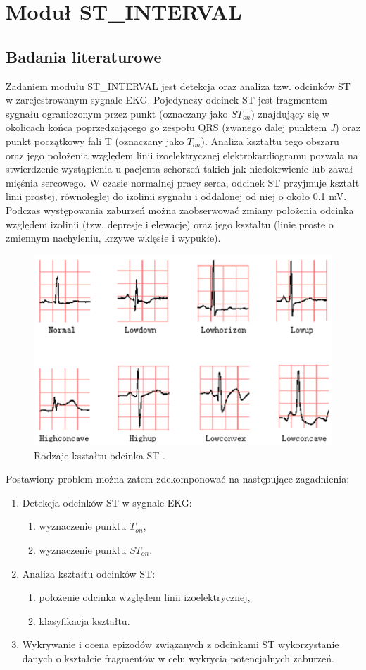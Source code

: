 \section{Moduł ST\_INTERVAL}
\subsection{Badania literaturowe}
Zadaniem modułu ST\_INTERVAL jest detekcja oraz analiza tzw. odcinków ST w zarejestrowanym sygnale EKG. Pojedynczy odcinek ST jest fragmentem sygnału ograniczonym przez punkt (oznaczany jako $ ST_{on} $) znajdujący się w okolicach końca poprzedzającego go zespołu QRS (zwanego dalej punktem \emph{J}) oraz punkt początkowy fali T (oznaczany jako $ T_{on} $). Analiza kształtu tego obszaru oraz jego położenia względem linii izoelektrycznej elektrokardiogramu pozwala na stwierdzenie wystąpienia u pacjenta schorzeń takich jak niedokrwienie lub zawał mięśnia sercowego. W czasie normalnej pracy serca, odcinek ST przyjmuje kształt linii prostej, równoległej do izolinii sygnału i oddalonej od niej o około 0.1 mV.  Podczas występowania zaburzeń można zaobserwować zmiany położenia odcinka względem izolinii (tzw. depresje i elewacje) oraz jego kształtu (linie proste o zmiennym nachyleniu, krzywe wklęsłe i wypukłe).
\begin{figure}[H]
	\centering
	\includegraphics{ST_INTERVAL/img/ST_rodzajeST.png}
	\caption{Rodzaje kształtu odcinka ST \cite{STInt3}.}
	\label{fig:ST_rodzajeST}
\end{figure}
Postawiony problem można zatem zdekomponować na następujące zagadnienia:
\begin{enumerate}
	\item Detekcja odcinków ST w sygnale EKG:
	\begin{enumerate}
		\item wyznaczenie punktu $ T_{on} $,
		\item wyznaczenie punktu $ ST_{on} $.
	\end{enumerate}
	\item Analiza kształtu odcinków ST:
	\begin{enumerate}
		\item położenie odcinka względem linii izoelektrycznej,
		\item klasyfikacja kształtu.
	\end{enumerate}
	\item Wykrywanie i ocena epizodów związanych z odcinkami ST wykorzystanie danych o kształcie fragmentów w celu wykrycia potencjalnych zaburzeń.
\end{enumerate}

